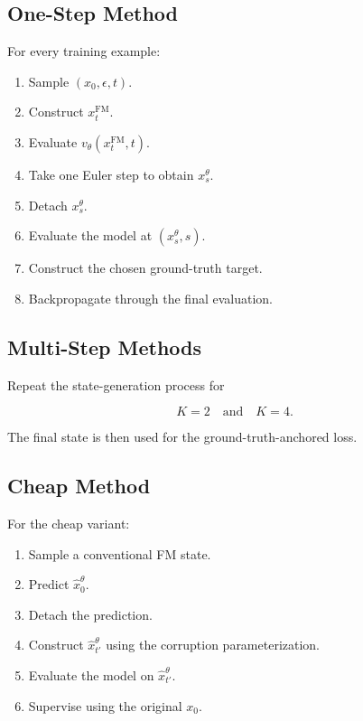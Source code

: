 \documentclass[11pt]{article}
\begin{document}
\subsection{One-Step Method}

For every training example:

\begin{enumerate}[leftmargin=*]
    \item Sample $(x_0,\epsilon,t)$.
    \item Construct $x_t^{\mathrm{FM}}$.
    \item Evaluate $v_\theta(x_t^{\mathrm{FM}},t)$.
    \item Take one Euler step to obtain $x_s^\theta$.
    \item Detach $x_s^\theta$.
    \item Evaluate the model at $(x_s^\theta,s)$.
    \item Construct the chosen ground-truth target.
    \item Backpropagate through the final evaluation.
\end{enumerate}

\subsection{Multi-Step Methods}

Repeat the state-generation process for

\begin{equation}
K=2
\quad\text{and}\quad
K=4.
\end{equation}

The final state is then used for the ground-truth-anchored loss.

\subsection{Cheap Method}

For the cheap variant:

\begin{enumerate}[leftmargin=*]
    \item Sample a conventional FM state.
    \item Predict $\hat{x}_0^\theta$.
    \item Detach the prediction.
    \item Construct $\hat{x}_{t'}^\theta$ using the corruption parameterization.
    \item Evaluate the model on $\hat{x}_{t'}^\theta$.
    \item Supervise using the original $x_0$.
\end{enumerate}
\end{document}
